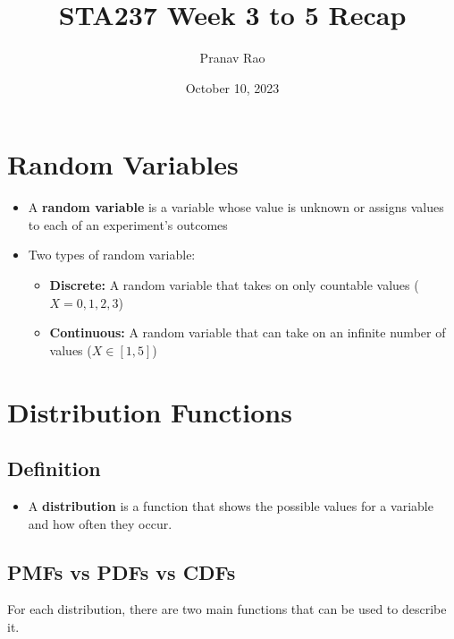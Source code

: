 \documentclass[12pt]{article}
\title{STA237 Week 3 to 5 Recap}
\author{Pranav Rao}
\date{October 10, 2023}
\begin{document}
\maketitle

\section{Random Variables}
\begin{itemize}
	\item A \textbf{random variable} is a variable whose value is unknown or assigns values to each of an experiment's outcomes
	\item Two types of random variable:
	      \begin{itemize}
		      \item \textbf{Discrete:} A random variable that takes on only countable values ($X = 0, 1, 2, 3$)
		      \item \textbf{Continuous:} A random variable that can take on an infinite number of values ($X \in [1, 5]$)
	      \end{itemize}
\end{itemize}

\section{Distribution Functions}
\subsection{Definition}
\begin{itemize}
	\item A \textbf{distribution} is a function that shows the possible values
	      for a variable and how often they occur.
\end{itemize}

\subsection{PMFs vs PDFs vs CDFs}

For each distribution, there are two main functions that can be used to describe it.
\end{document}
